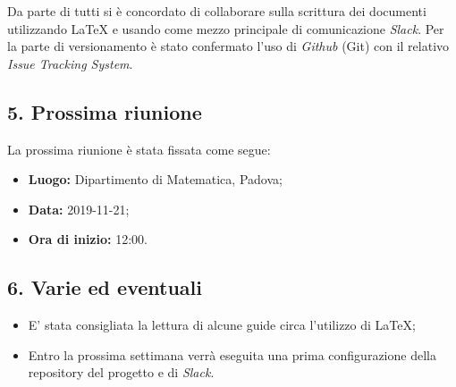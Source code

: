 Da parte di tutti si è concordato di collaborare sulla scrittura dei documenti utilizzando \LaTeX{} e usando come mezzo principale di comunicazione \textit{Slack}. Per la parte di versionamento è stato confermato l'uso di \textit{Github} (Git) con il relativo \textit{Issue Tracking System}.

\subsection*{5. Prossima riunione}

La prossima riunione è stata fissata come segue:
\begin{itemize}
	\item \textbf{Luogo:} Dipartimento di Matematica, Padova;
	\item \textbf{Data:} 2019-11-21;
	\item \textbf{Ora di inizio:} 12:00.
\end{itemize}


\subsection*{6. Varie ed eventuali}

\begin{itemize}
	\item E' stata consigliata la lettura di alcune guide circa l'utilizzo di \LaTeX ;
	\item Entro la prossima settimana verrà eseguita una prima configurazione della repository del progetto e di \textit{Slack}.
\end{itemize}
